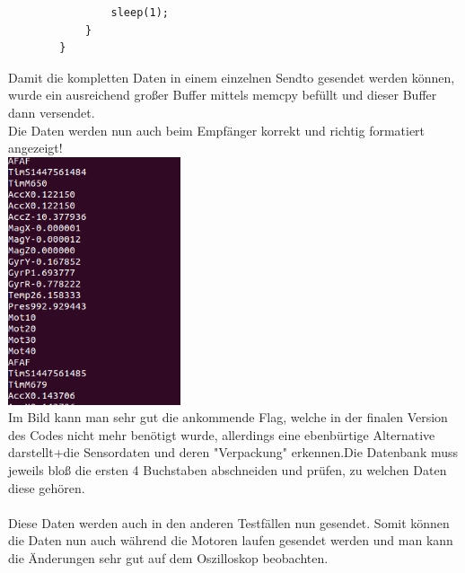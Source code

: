 \documentclass{article}
\begin{document}
\begin{enumerate}
\begin{verbatim}
                sleep(1);
            }
        }
\end{verbatim}

Damit die kompletten Daten in einem einzelnen Sendto gesendet werden können, wurde ein ausreichend großer Buffer mittels memcpy befüllt und dieser Buffer dann versendet.\\
Die Daten werden nun auch beim Empfänger korrekt und richtig formatiert angezeigt!\\
\includegraphics[height=7.3cm]{graphics/sensor.png}\\

Im Bild kann man sehr gut die ankommende Flag, welche in der finalen Version des Codes nicht mehr benötigt wurde, allerdings eine ebenbürtige Alternative darstellt+die Sensordaten und deren "Verpackung" erkennen.Die Datenbank muss jeweils bloß die ersten 4 Buchstaben abschneiden und prüfen, zu welchen Daten diese gehören.\\
\\

Diese Daten werden auch in den anderen Testfällen nun gesendet. Somit können die Daten nun auch während die Motoren laufen gesendet werden und man kann die Änderungen sehr gut auf dem Oszilloskop beobachten.\\

\end{enumerate}
\end{document}
